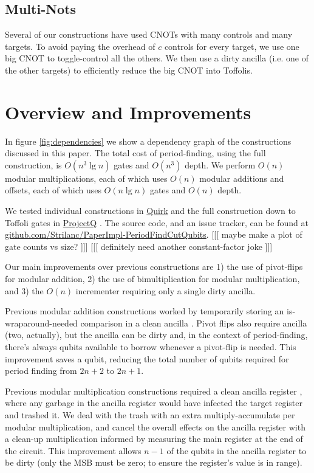 \documentclass[twocolumn]{article}
\begin{document}
\subsection{Multi-Nots}

Several of our constructions have used CNOTs with many controls and many targets.
To avoid paying the overhead of $c$ controls for every target, we use one big CNOT to toggle-control all the others.
We then use a dirty ancilla (i.e. one of the other targets) to efficiently reduce the big CNOT into Toffolis.


\section{Overview and Improvements} \label{sec:costs}

In figure \ref{fig:dependencies} we show a dependency graph of the constructions discussed in this paper.
The total cost of period-finding, using the full construction, is $O(n^3 \lg n)$ gates and $O(n^3)$ depth.
We perform $O(n)$ modular multiplications, each of which uses $O(n)$ modular additions and offsets, each of which uses $O(n \lg n)$ gates \cite{haner2016} and $O(n)$ depth.

We tested individual constructions in \href{https://github.com/Strilanc/Quirk}{Quirk} and the full construction down to Toffoli gates in \href{https://github.com/ProjectQ-Framework/ProjectQ}{ProjectQ} \cite{projq2016}.
The source code, and an issue tracker, can be found at \href{https://github.com/Strilanc/PaperImpl-PeriodFindCutQubits}{github.com/Strilanc/PaperImpl-PeriodFindCutQubits}.
[[[ maybe make a plot of gate counts vs size? ]]] [[[ definitely need another constant-factor joke ]]]

Our main improvements over previous constructions are 1) the use of pivot-flips for modular addition, 2) the use of bimultiplication for modular multiplication, and 3) the $O(n)$ incrementer requiring only a single dirty ancilla.

Previous modular addition constructions worked by temporarily storing an is-wraparound-needed comparison in a clean ancilla \cite{takahashi2006, haner2016}.
Pivot flips also require ancilla (two, actually), but the ancilla can be dirty and, in the context of period-finding, there's always qubits available to borrow whenever a pivot-flip is needed.
This improvement saves a qubit, reducing the total number of qubits required for period finding from $2n+2$ to $2n+1$.

Previous modular multiplication constructions required a clean ancilla register \cite{haner2016}, where any garbage in the ancilla register would have infected the target register and trashed it.
We deal with the trash with an extra multiply-accumulate per modular multiplication, and cancel the overall effects on the ancilla register with a clean-up multiplication informed by measuring the main register at the end of the circuit.
This improvement allows $n-1$ of the qubits in the ancilla register to be dirty (only the MSB must be zero; to ensure the register's value is in range).
\end{document}
